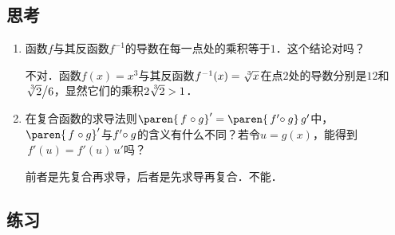 \subsection*{思考}

\begin{enumerate}
\item 函数\(f\)与其反函数\(f^{-1}\)的导数在每一点处的乘积等于\(1\)．这个结论对吗？

  \ifshowsolp
  不对．函数\(f(x) = x^3\!\)与其反函数\(f^{-1}(x) = \sqrt[\leftroot{-2}\uproot{2}3]x\)在点\(2\)处的导数分别是\(12\)和\(\sqrt[\leftroot{-2}\uproot{2}3]{2}\big/{6}\)，显然它们的乘积\(2\sqrt[\leftroot{-2}\uproot{2}3]2 > 1\)．
  \fi

\item 在复合函数的求导法则\(\paren{\,f\mkern1mu \circ g}' = \paren{\,f'\mkern-4mu \circ g}\,g'\)中，\(\paren{\,f\mkern1mu \circ g}'\)与\(f'\mkern-4mu \circ g\)的含义有什么不同？若令\(u = g(x)\)，能得到\(\,f'(u) = f'(u)\,u'\)吗？

  \ifshowsolp
  前者是先复合再求导，后者是先求导再复合．不能．
  \fi
\end{enumerate}

\ifshowex
{}
\subsection*{练习}

